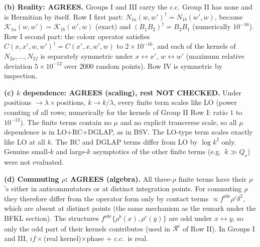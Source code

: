 \noindent\textbf{(b) Reality: AGREES.} Groups I and III carry the c.c. Group II has none and is Hermitian by itself. Row I first part: $N_{1a}(w,w')^{\dagger}=N_{1b}(w',w)$, because $\mathcal K_{1a}(w,w')=\mathcal K_{1b}(w',w)$ (exact) and $(B_{1}B_{2})^{\dagger}=B_{2}B_{1}$ (numerically $10^{-16}$). Row I second part: the colour operator satisfies $C(x,x',w,w')^{\dagger}=C(x',x,w',w)$ to $2\times10^{-16}$, and each of the kernels of $N_{2a},\dots,N_{2f}$ is separately symmetric under $x\leftrightarrow x'$, $w\leftrightarrow w'$ (maximum relative deviation $5\times10^{-12}$ over $2000$ random points). Row IV is symmetric by inspection.

\noindent\textbf{(c) $k$ dependence: AGREES (scaling), rest NOT CHECKED.} Under positions $\to\lambda\times$positions, $k\to k/\lambda$, every finite term scales like LO (power counting of all rows; numerically for the kernels of Group II Row I: ratio $1$ to $10^{-12}$). The finite terms contain no $\mu$ and no explicit transverse scale, so all $\mu$ dependence is in LO$+$RC$+$DGLAP, as in BSV. The LO-type term scales exactly like LO at all $k$. The RC and DGLAP terms differ from LO by $\log k^{2}$ only. Genuine small-$k$ and large-$k$ asymptotics of the other finite terms (e.g.\ $k\gg Q_{s}$) were not evaluated.

\noindent\textbf{(d) Commuting $\rho$: AGREES (algebra).} All three-$\rho$ finite terms have their $\rho$'s either in anticommutators or at distinct integration points. For commuting $\rho$ they therefore differ from the operator form only by contact terms $\propto f^{abc}\rho^{c}\delta^{2}$, which are absent at distinct points (the same mechanism as the remark under the BFKL section). The structures $f^{abc}\{\rho^{b}(x),\rho^{c}(y)\}$ are odd under $x\leftrightarrow y$, so only the odd part of their kernels contributes (used in $\mathcal R^{i}$ of Row II). In Groups I and III, $i f\times$(real kernel)$\times$phase $+$ c.c.\ is real.


